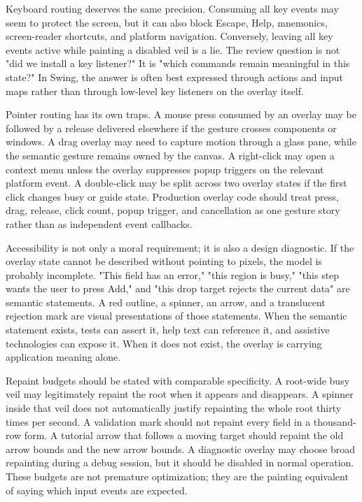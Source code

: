 Keyboard routing deserves the same precision. Consuming all key events may
seem to protect the screen, but it can also block Escape, Help, mnemonics,
screen-reader shortcuts, and platform navigation. Conversely, leaving all key
events active while painting a disabled veil is a lie. The review question is
not "did we install a key listener?" It is "which commands remain meaningful in
this state?" In Swing, the answer is often best expressed through actions and
input maps rather than through low-level key listeners on the overlay itself.

Pointer routing has its own traps. A mouse press consumed by an overlay may be
followed by a release delivered elsewhere if the gesture crosses components or
windows. A drag overlay may need to capture motion through a glass pane, while
the semantic gesture remains owned by the canvas. A right-click may open a
context menu unless the overlay suppresses popup triggers on the relevant
platform event. A double-click may be split across two overlay states if the
first click changes busy or guide state. Production overlay code should treat
press, drag, release, click count, popup trigger, and cancellation as one
gesture story rather than as independent event callbacks.

Accessibility is not only a moral requirement; it is also a design diagnostic.
If the overlay state cannot be described without pointing to pixels, the model
is probably incomplete. "This field has an error," "this region is busy,"
"this step wants the user to press Add," and "this drop target rejects the
current data" are semantic statements. A red outline, a spinner, an arrow, and
a translucent rejection mark are visual presentations of those statements. When
the semantic statement exists, tests can assert it, help text can reference it,
and assistive technologies can expose it. When it does not exist, the overlay
is carrying application meaning alone.

Repaint budgets should be stated with comparable specificity. A root-wide busy
veil may legitimately repaint the root when it appears and disappears. A
spinner inside that veil does not automatically justify repainting the whole
root thirty times per second. A validation mark should not repaint every field
in a thousand-row form. A tutorial arrow that follows a moving target should
repaint the old arrow bounds and the new arrow bounds. A diagnostic overlay may
choose broad repainting during a debug session, but it should be disabled in
normal operation. These budgets are not premature optimization; they are the
painting equivalent of saying which input events are expected.

